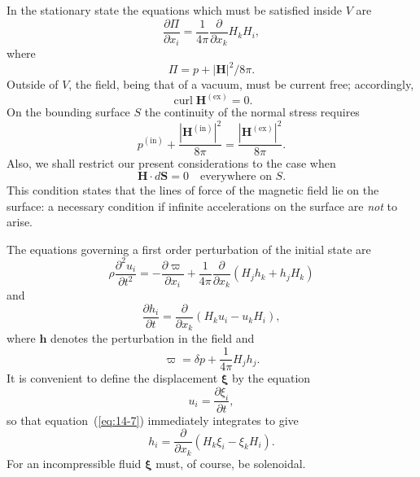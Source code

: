 In the stationary state the equations which must be satisfied inside $V$ are
\begin{equation}
\label{eq:14-1}
\frac{\partial \Pi}{\partial x_i} = \frac{1}{4\pi} \frac{\partial}{\partial x_k} H_k H_i,
\end{equation}
where
\begin{equation}
\label{eq:14-2}
\Pi = p + |\mathbf{H}|^2 / 8\pi.
\end{equation}
Outside of $V$, the field, being that of a vacuum, must be current free; accordingly,
\begin{equation}
\label{eq:14-3}
\operatorname{curl} \mathbf{H}^{(\mathrm{ex})} = 0.
\end{equation}
On the bounding surface $S$ the continuity of the normal stress requires
\begin{equation}
\label{eq:14-4}
p^{(\mathrm{in})} + \frac{|\mathbf{H}^{(\mathrm{in})}|^2}{8\pi} = \frac{|\mathbf{H}^{(\mathrm{ex})}|^2}{8\pi}.
\end{equation}
Also, we shall restrict our present considerations to the case when
\begin{equation}
\label{eq:14-5}
\mathbf{H} \cdot d\mathbf{S} = 0 \quad \text{everywhere on } S.
\end{equation}
This condition states that the lines of force of the magnetic field lie on the surface: a necessary condition if infinite accelerations on the surface are \emph{not} to arise.

The equations governing a first order perturbation of the initial state are
\begin{equation}
\label{eq:14-6}
\rho \frac{\partial^2 u_i}{\partial t^2} = -\frac{\partial \varpi}{\partial x_i} + \frac{1}{4\pi} \frac{\partial}{\partial x_k} (H_j h_k + h_j H_k)
\end{equation}
and
\begin{equation}
\label{eq:14-7}
\frac{\partial h_i}{\partial t} = \frac{\partial}{\partial x_k} (H_k u_i - u_k H_i),
\end{equation}
where $\mathbf{h}$ denotes the perturbation in the field and
\begin{equation}
\label{eq:14-8}
\varpi = \delta p + \frac{1}{4\pi} H_j h_j.
\end{equation}
It is convenient to define the displacement $\boldsymbol{\xi}$ by the equation
\begin{equation}
\label{eq:14-9}
u_i = \frac{\partial \xi_i}{\partial t},
\end{equation}
so that equation~(\ref{eq:14-7}) immediately integrates to give
\begin{equation}
\label{eq:14-10}
h_i = \frac{\partial}{\partial x_k} (H_k \xi_i - \xi_k H_i).
\end{equation}
For an incompressible fluid $\boldsymbol{\xi}$ must, of course, be solenoidal.

